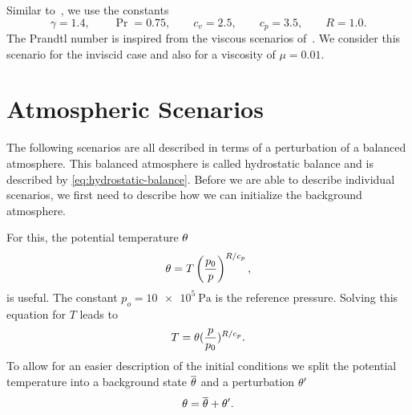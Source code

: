Similar to~\cite{helzel2000modified}, we use the constants
\begin{equation}
  \gamma = 1.4 ,\qquad \Pr = 0.75, \qquad c_v = 2.5 ,\qquad c_p = 3.5 ,\qquad R = 1.0.
\end{equation}
The Prandtl number is inspired from the viscous scenarios of~\cite{hidalgo2011ader}.
We consider this scenario for the inviscid case and also for a viscosity of $\mu = 0.01$.

\section{Atmospheric Scenarios}
The following scenarios are all described in terms of a perturbation of a balanced atmosphere.
This balanced atmosphere is called hydrostatic balance and is described by \cref{eq:hydrostatic-balance}.
Before we are able to describe individual scenarios, we first need to describe how we can initialize the background atmosphere.

For this, the potential temperature $\theta$
\begin{equation}
  \theta = T \left( \frac{p_0}{p} \right)^{R/c_p},
\end{equation}
is useful.
The constant $p_o = \SI{10e5}{\Pa}$ is the reference pressure.
Solving this equation for $T$ leads to
\begin{equation}
  \label{eq:potTToT}
  T = \theta (\frac{p}{p_0})^{R/c_p}.
\end{equation}
To allow for an easier description of the initial conditions we split the potential temperature into a background state $\overline{\theta}$ and a perturbation $\theta'$
\begin{equation}
  \label{eq:potT-split}
  \theta = \overline{\theta} + \theta'.
\end{equation}

